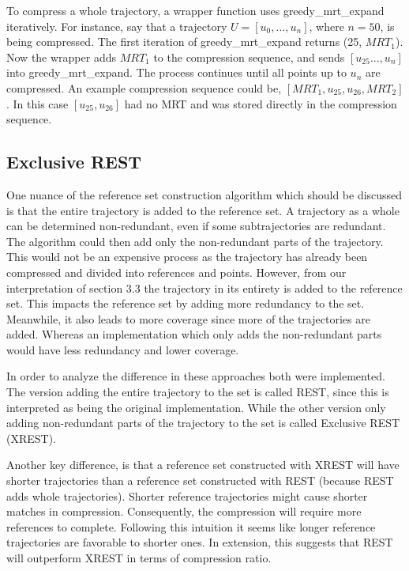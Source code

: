 To compress a whole trajectory, a wrapper function uses greedy\_mrt\_expand iteratively. For instance, say that a trajectory $U = [u_0, ..., u_n]$, where $n = 50$, is being compressed. The first iteration of greedy\_mrt\_expand returns (25, $MRT_1$). Now the wrapper adds $MRT_1$ to the compression sequence, and sends $[u_{25} ..., u_n]$ into greedy\_mrt\_expand. The process continues until all points up to $u_n$ are compressed. An example compression sequence could be, $[MRT_1, u_{25}, u_{26}, MRT_2]$. In this case $[u_{25}, u_{26}]$ had no MRT and was stored directly in the compression sequence.

\subsection{Exclusive REST}
One nuance of the reference set construction algorithm which should be discussed is that the entire trajectory is added to the reference set. A trajectory as a whole can be determined non-redundant, even if some subtrajectories are redundant. The algorithm could then add only the non-redundant parts of the trajectory. This would not be an expensive process as the trajectory has already been compressed and divided into references and points. However, from our interpretation of \cite{zhao2018rest} section 3.3 the trajectory in its entirety is added to the reference set. This impacts the reference set by adding more redundancy to the set. Meanwhile, it also leads to more coverage since more of the trajectories are added. Whereas an implementation which only adds the non-redundant parts would have less redundancy and lower coverage.

In order to analyze the difference in these approaches both were implemented. The version adding the entire trajectory to the set is called REST, since this is interpreted as being the original implementation. While the other version only adding non-redundant parts of the trajectory to the set is called Exclusive REST (XREST).

Another key difference, is that a reference set constructed with XREST will have shorter trajectories than a reference set constructed with REST (because REST adds whole trajectories). Shorter reference trajectories might cause shorter matches in compression. Consequently, the compression will require more references to complete. Following this intuition it seems like longer reference trajectories are favorable to shorter ones. In extension, this suggests that REST will outperform XREST in terms of compression ratio.

